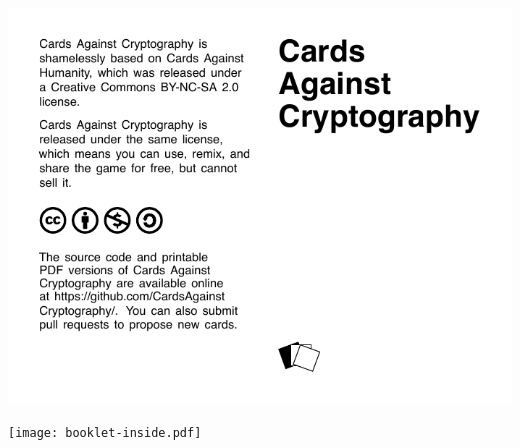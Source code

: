 \documentclass{article}
\begin{document}
\pagestyle{empty}

\begin{center}
\includegraphics{booklet-outside.pdf}	
\end{center}

\newpage

\begin{center}
\texttt{[image: booklet-inside.pdf]}	
\end{center}
\end{document}
